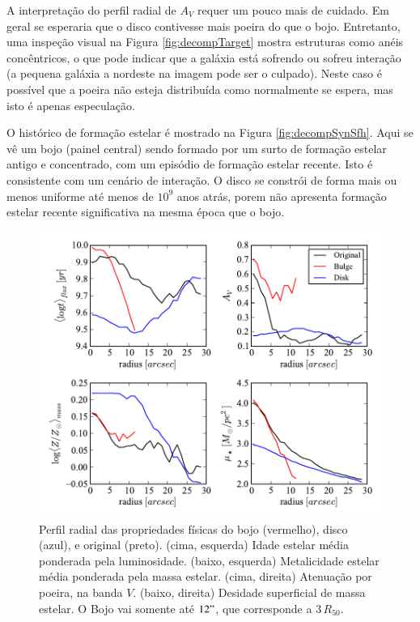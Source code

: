  
A interpretação do perfil radial de $A_V$ requer um pouco mais de cuidado. Em
geral se esperaria que o disco contivesse mais poeira do que o bojo.
Entretanto, uma inspeção visual na Figura \ref{fig:decompTarget} mostra
estruturas como anéis concêntricos, o que pode indicar que a galáxia está
sofrendo ou sofreu interação (a pequena galáxia a nordeste na imagem pode ser o
culpado). Neste caso é possível que a poeira não esteja distribuída como
normalmente se espera, mas isto é apenas especulação.

O histórico de formação estelar é mostrado na Figura \ref{fig:decompSynSfh}.
Aqui se vê um bojo (painel central) sendo formado por um surto de formação
estelar antigo e concentrado, com um episódio de formação estelar recente. Isto
é consistente com um cenário de interação. O disco se constrói de forma mais ou
menos uniforme até menos de $10^9$ anos atrás, porem não apresenta formação
estelar recente significativa na mesma época que o bojo.

\begin{figure}
	\includegraphics{figuras/decomp-at-aZ-AV-mu}
	\caption[Perfil radial das propriedades do bojo, disco, e total] {Perfil
	radial das propriedades físicas do bojo (vermelho), disco (azul), e original
	(preto). (cima, esquerda) Idade estelar média ponderada pela luminosidade.
	(baixo, esquerda) Metalicidade estelar média ponderada pela massa estelar.
	(cima, direita) Atenuação por poeira, na banda $V$. (baixo, direita) Desidade
	superficial de massa estelar. O Bojo vai somente até $12"$, que corresponde a
	$3\,R_{50}$.}
	\label{fig:decompSynRadprof}
\end{figure}


